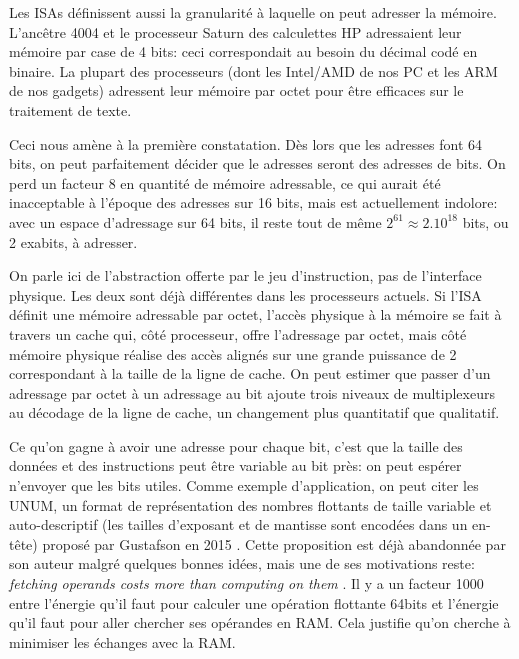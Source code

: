 \documentclass[architecture]{compas2018}
\begin{document}
Les ISAs définissent aussi  la granularité à laquelle on peut adresser la mémoire.
L'ancêtre 4004 et le processeur Saturn des calculettes HP adressaient leur mémoire par case de 4 bits: ceci correspondait au besoin du décimal codé en binaire.
La plupart des processeurs (dont les Intel/AMD de nos PC et les ARM de nos gadgets) adressent leur mémoire par octet pour être efficaces sur le traitement de texte.

Ceci nous amène à la première constatation. Dès lors que les adresses font 64 bits, on peut parfaitement décider  que le adresses seront des adresses de bits.
On perd un facteur 8 en quantité de mémoire adressable, ce qui aurait été inacceptable à l'époque des adresses sur 16 bits, mais est actuellement indolore: avec un espace d'adressage sur 64 bits, il reste tout de même $2^{61}\approx 2.10^{18}$ bits, ou 2 exabits, à adresser.


On parle ici de l'abstraction offerte par le jeu d'instruction, pas de l'interface physique.
Les deux sont déjà différentes dans les processeurs actuels.
Si l'ISA définit une mémoire adressable par octet, l'accès physique à la mémoire se fait à travers un cache qui, côté processeur, offre l'adressage par octet, mais côté mémoire physique  réalise des accès alignés sur une grande puissance de 2 correspondant à la taille de la ligne de cache.
 On peut estimer que passer d'un adressage par octet à un adressage au bit ajoute trois niveaux de multiplexeurs au décodage de la ligne de cache, un changement plus quantitatif que qualitatif.


Ce qu'on gagne à avoir une adresse pour chaque bit, c'est que la taille des données et des instructions peut être variable au bit près: on peut espérer n'envoyer que les bits utiles.
Comme exemple d'application, on peut citer les UNUM, un format de représentation des nombres flottants de taille variable et auto-descriptif (les tailles d'exposant et de mantisse sont encodées dans un en-tête) proposé par  Gustafson en 2015 \cite{2015-02-GUSTAFSON}.
Cette proposition est déjà abandonnée par son auteur \cite{2016-09-TICHY} malgré quelques bonnes idées, mais une de ses  motivations reste: \emph{fetching operands costs more than computing on them} \cite{Dally:SC2010}.
Il y a un facteur 1000  entre l'énergie qu'il faut pour calculer une opération flottante 64bits et l'énergie qu'il faut pour aller chercher ses opérandes en RAM.
Cela justifie qu'on cherche à minimiser les échanges avec la RAM.
\end{document}
